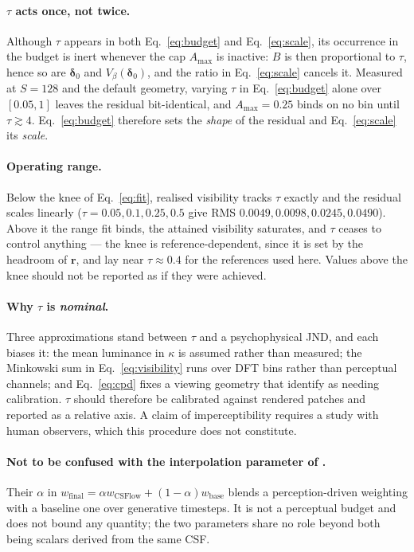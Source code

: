 \paragraph{$\tau$ acts once, not twice.} Although $\tau$ appears in both
Eq.~\eqref{eq:budget} and Eq.~\eqref{eq:scale}, its occurrence in the
budget is inert whenever the cap $A_{\max}$ is inactive: $B$ is then
proportional to $\tau$, hence so are $\boldsymbol{\delta}_0$ and
$V_\beta(\boldsymbol{\delta}_0)$, and the ratio in
Eq.~\eqref{eq:scale} cancels it. Measured at $S=128$ and the default
geometry, varying $\tau$ in Eq.~\eqref{eq:budget} alone over
$[0.05,1]$ leaves the residual bit-identical, and $A_{\max}=0.25$ binds
on no bin until $\tau\gtrsim4$. Eq.~\eqref{eq:budget} therefore sets the
\emph{shape} of the residual and Eq.~\eqref{eq:scale} its \emph{scale}.

\paragraph{Operating range.} Below the knee of
Eq.~\eqref{eq:fit}, realised visibility tracks $\tau$ exactly and the
residual scales linearly ($\tau=0.05,0.1,0.25,0.5$ give RMS
$0.0049,0.0098,0.0245,0.0490$). Above it the range fit binds, the
attained visibility saturates, and $\tau$ ceases to control anything ---
the knee is reference-dependent, since it is set by the headroom of
$\mathbf{r}$, and lay near $\tau\approx0.4$ for the references used
here. Values above the knee should not be reported as if they were
achieved.

\paragraph{Why $\tau$ is \emph{nominal}.} Three approximations stand
between $\tau$ and a psychophysical JND, and each biases it: the mean
luminance in $\kappa$ is assumed rather than measured; the Minkowski sum
in Eq.~\eqref{eq:visibility} runs over DFT bins rather than perceptual
channels; and Eq.~\eqref{eq:cpd} fixes a viewing geometry that
\citet[Sec.~6]{galinska2026csflow} identify as needing calibration.
$\tau$ should therefore be calibrated against rendered patches and
reported as a relative axis. A claim of imperceptibility requires a
study with human observers, which this procedure does not constitute.

\paragraph{Not to be confused with the interpolation parameter of
\citet{galinska2026csflow}.} Their $\alpha$ in
$w_{\mathrm{final}}=\alpha w_{\mathrm{CSFlow}}+(1-\alpha)w_{\mathrm{base}}$
blends a perception-driven weighting with a baseline one over generative
timesteps. It is not a perceptual budget and does not bound any
quantity; the two parameters share no role beyond both being scalars
derived from the same CSF.

